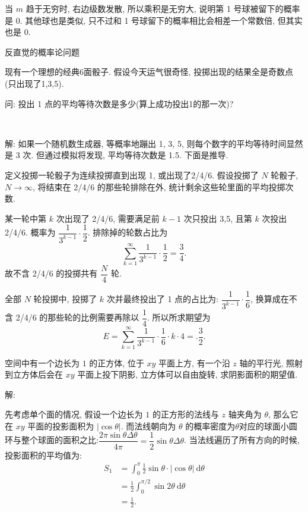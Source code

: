 当 $ m $ 趋于无穷时, 右边级数发散, 所以乘积是无穷大, 说明第 1 号球被留下的概率是 0. 其他球也是类似, 只不过和 1 号球留下的概率相比会相差一个常数倍, 但其实也是 0.

\newpage
\noindent 反直觉的概率论问题

现有一个理想的经典6面骰子. 假设今天运气很奇怪, 投掷出现的结果全是奇数点(只出现了1,3,5).

问: 投出 1 点的平均等待次数是多少(算上成功投出1的那一次)?

~

解: 如果一个随机数生成器, 等概率地蹦出 1, 3, 5, 则每个数字的平均等待时间显然是 3 次. 但通过模拟将发现, 平均等待次数是 1.5. 下面是推导.

定义投掷一轮骰子为连续投掷直到出现 1, 或出现了2/4/6. 假设投掷了 $N$ 轮骰子, $N\to\infty$, 将结束在 2/4/6 的那些轮排除在外, 统计剩余这些轮里面的平均投掷次数.

某一轮中第 $k$ 次出现了 2/4/6, 需要满足前 $k-1$ 次只投出 3,5, 且第 $k$ 次投出 2/4/6. 概率为 $\dfrac{1}{3^{k-1}}\cdot\dfrac{1}{2}$. 排除掉的轮数占比为 
\[\sum_{k=1}^{\infty}\dfrac{1}{3^{k-1}}\cdot\dfrac{1}{2} = \frac{3}{4} .\]
故不含 2/4/6 的投掷共有 $\dfrac{N}{4}$ 轮.

全部 $N$ 轮投掷中, 投掷了 $k$ 次并最终投出了 1 点的占比为: $\dfrac{1}{3^{k-1}}\cdot\dfrac{1}{6}$, 换算成在不含 2/4/6 的那些轮的比例需要再除以 $\dfrac{1}{4}$. 所以所求期望为
\[ E = \sum_{k=1}^\infty \dfrac{1}{3^{k-1}}\cdot\dfrac{1}{6}\cdot k \cdot 4 = .\frac{3}{2} .\]

\newpage

空间中有一个边长为 $ 1 $ 的正方体, 位于 $xy$ 平面上方, 有一个沿 $z$ 轴的平行光, 照射到立方体后会在 $xy$ 平面上投下阴影, 立方体可以自由旋转, 求阴影面积的期望值.

\noindent 解: 

先考虑单个面的情况, 假设一个边长为 $1$ 的正方形的法线与 $z$ 轴夹角为 $\theta$, 那么它在 $xy$ 平面的投影面积为 $|\cos\theta|$. 而法线朝向为 $\theta$ 的概率密度为$\theta$对应的球面小圆环与整个球面的面积之比:$\dfrac{2\pi\sin\theta\Delta\theta}{4\pi}=\dfrac{1}{2}\sin\theta\Delta\theta$. 当法线遍历了所有方向的时候, 投影面积的平均值为:
\begin{align*}
 S_1 &= \int_0^\pi {\frac{1}{2}\sin\theta\cdot |\cos\theta|\ \mathrm{d}\theta} \\
&= \frac{1}{2}\int_0^{\pi/2} {\sin 2\theta \ \mathrm{d}\theta} \\
&= \frac{1}{2}.
\end{align*}

